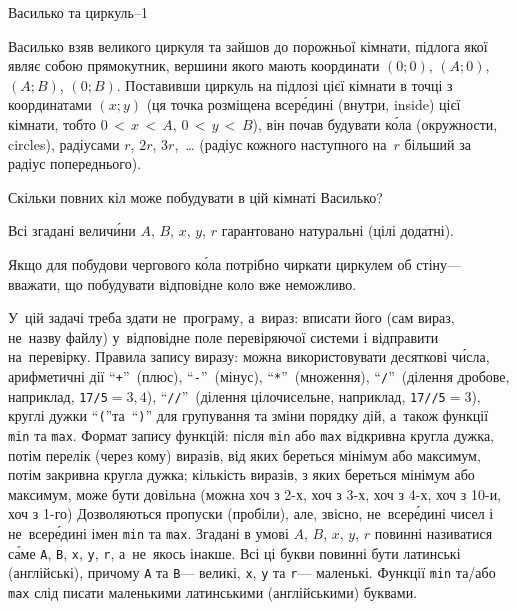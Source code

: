 {

\PrintEjudgeConstraintsfalse

\begin{problemAllDefault}{Василько та циркуль--1}
\label{problem:2020oioi-circles-in-room}

Василько взяв великого циркуля та зайшов до порожньої кімнати, підлога якої являє собою прямокутник, вершини якого мають координати $(0;0)$, $(A; 0)$, $(A; B)$, $(0; B)$. Поставивши циркуль на підлозі цієї кімнати в точці з координатами $(x;y)$ (ця точка розміщена всер\'{е}дині (внутри, inside) цієї кімнати, тобто ${0\,{<}\,x\,{<}\,A}$, ${0\,{<}\,y\,{<}\,B}$), він почав будувати к\'{о}ла (окружности, circles), радіусами $r$, $2r$, $3r$,~\dots{} (радіус кожного наступного на~$r$ більший за радіус попереднього). 

Скільки повних кіл може побудувати в цій кімнаті Василько?

Всі згадані велич\'{и}ни $A$, $B$, $x$, $y$, $r$ гарантовано натуральні (цілі додатні). 

Якщо для побудови чергового к\'{о}ла потрібно чиркати циркулем об стіну\nolinebreak[3] --- вважати, що побудувати відповідне коло вже неможливо.

У~цій задачі треба здати не~програму, а~вираз: 
вписати його (сам вираз, не~назву файлу) у~відповідне поле перевіряючої системи
і відправити на~перевірку. Правила запису виразу:
можна використовувати десяткові ч\'{и}сла, арифметичні дії ``\verb"+"''~(плюс), 
``\verb"-"''~(мінус), ``\verb"*"''~(множення), ``\verb"/"''~(ділення дробове, наприклад, \verb"17/5"${=}3{,}4$), ``\verb"//"''~(ділення цілочисельне, наприклад, \verb"17//5"${=}3$), круглі дужки ``\verb"("''\nolinebreak[2] та~``\verb")"'' 
для групування та зміни порядку дій, а~також функції \verb"min" та \verb"max".
Формат запису функцій: після \verb"min" або \verb"max" відкривна кругла дужка, потім перелік (через кому) виразів, від яких береться мінімум або максимум, потім закривна кругла дужка; кількість виразів, з яких береться мінімум або максимум, може бути довільна (можна хоч з \mbox{2-х}, хоч з \mbox{3-х}, хоч з \mbox{4-х}, хоч з \mbox{10-и}, хоч з \mbox{1-го})
Дозволяються пропуски (пробіли), 
але, звісно, не~всер\'{е}дині чисел і не~всер\'{е}дині імен \verb"min" та \verb"max".
Згадані в умові $A$, $B$, $x$, $y$, $r$ повинні називатися с\'{а}ме 
\texttt{A},
\texttt{B},
\texttt{x},
\texttt{y},
\texttt{r},
а~не~якось інакше. Всі ці букви повинні бути латинські (англійські), причому \texttt{A} та \texttt{B}\nolinebreak[3] --- великі, \texttt{x}, \texttt{y} та \texttt{r}\nolinebreak[3] --- маленькі. Функції \verb"min" та/або \verb"max" слід писати маленькими латинськими (англійськими) буквами.


\end{problemAllDefault}}
